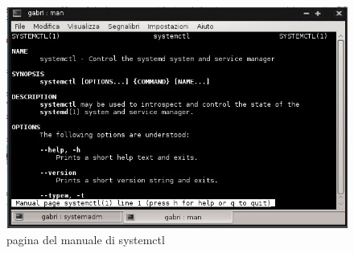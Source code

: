 \begin{figure}[!htbp]
\centering
\includegraphics[scale=.80]{articoli/sistema_base/immagini/man_systemctl.jpeg}
\caption{pagina del manuale di systemctl}
\end{figure}

